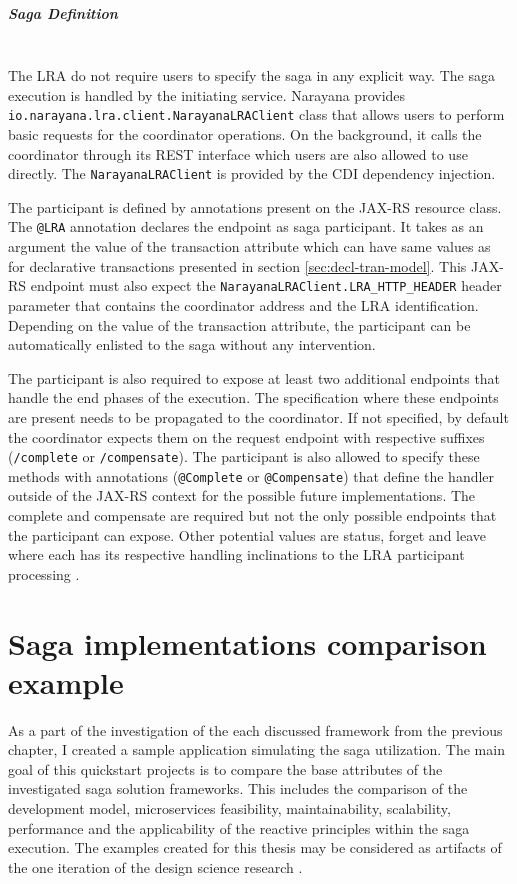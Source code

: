 \documentclass[oneside,
  digital, %
  table,   %
  nolof,     %
  nolot,     %
]{fithesis3}
\newcommand{\newlinepar}[1]{\paragraph{#1}\needspace{4\baselineskip}\mbox{}\\}
\begin{document}
\newlinepar{Saga Definition}

The LRA do not require users to specify the saga in any explicit way. The saga execution is handled by the initiating service. Narayana provides \texttt{io.narayana.lra.client.NarayanaLRAClient} class that allows users to perform basic requests for the coordinator operations. On the background, it calls the coordinator through its REST interface which users are also allowed to use directly. The \texttt{NarayanaLRAClient} is provided by the CDI dependency injection.

The participant is defined by annotations present on the JAX-RS resource class. The \texttt{@LRA} annotation declares the endpoint as saga participant. It takes as an argument the value of the transaction attribute which can have same values as for declarative transactions presented in section \ref{sec:decl-tran-model}. This JAX-RS endpoint must also expect the \texttt{NarayanaLRAClient.LRA\_HTTP\_HEADER} header parameter that contains the coordinator address and the LRA identification. Depending on the value of the transaction attribute, the participant can be automatically enlisted to the saga without any intervention.

The participant is also required to expose at least two additional endpoints that handle the end phases of the execution. The specification where these endpoints are present needs to be propagated to the coordinator. If not specified, by default the coordinator expects them on the request endpoint with respective suffixes (\texttt{/complete} or \texttt{/compensate}). The participant is also allowed to specify these methods with annotations (\texttt{@Complete} or \texttt{@Compensate}) that define the handler outside of the JAX-RS context for the possible future implementations. The complete and compensate are required but not the only possible endpoints that the participant can expose. Other potential values are status, forget and leave where each has its respective handling inclinations to the LRA participant processing \cite{narayana_lra}.


\clearpage
\chapter{Saga implementations comparison example}

As a part of the investigation of the each discussed framework from the previous chapter, I created a sample application simulating the saga utilization. The main goal of this quickstart projects is to compare the base attributes of the investigated saga solution frameworks. This includes the comparison of the development model, microservices feasibility, maintainability, scalability, performance and the applicability of the reactive principles within the saga execution. The examples created for this thesis may be considered as artifacts of the one iteration of the design science research \cite{design_science}.
\end{document}
